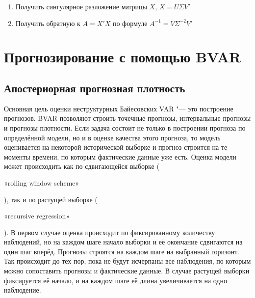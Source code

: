 \documentclass[11pt]{article} %
\newcommand{\eng}[1]{\begin{otherlanguage}{english}#1\end{otherlanguage}}
\begin{document}
\begin{enumerate}
\item Получить сингулярное разложение матрицы $X$, $X=U\Sigma V'$
\item Получить обратную к $A=X'X$ по формуле $A^{-1}=V\Sigma^{-2} V'$
\end{enumerate}


%
%
\section{Прогнозирование с помощью BVAR}

\subsection{Апостериорная прогнозная плотность}
Основная цель оценки неструктурных Байесовских VAR "--- это построение прогнозов. BVAR позволяют строить точечные прогнозы, интервальные прогнозы и  прогнозы  плотности. Если задача состоит не только в построении прогноза по определённой модели, но и в оценке качества этого прогноза, то модель оценивается на некоторой исторической выборке и прогноз строится на те моменты времени, по которым фактические данные уже есть. Оценка модели может происходить как по сдвигающейся выборке (\eng{«rolling window scheme»}), так и по растущей выборке (\eng{«recursive regression»}). В первом случае оценка происходит по фиксированному количеству наблюдений, но на каждом шаге начало выборки и её окончание сдвигаются на один шаг вперёд. Прогнозы строятся на каждом шаге на выбранный горизонт.  Так происходит до тех пор, пока не будут исчерпаны все наблюдения, по которым можно сопоставить прогнозы и фактические данные. В случае растущей выборки фиксируется её начало, и на каждом шаге её длина увеличивается на одно наблюдение.
\end{document}
